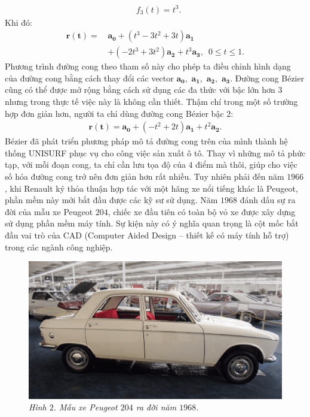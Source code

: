 \begin{multicols}{2}
\begin{align*}
		&f_{3} (t)=t^3.
	\end{align*}
	Khi đó:
	\begin{align*}
		\pmb{r(t)}=\,&\pmb{a_0}+(t^3-3t^2+3t) \pmb{a_1}\\
		&+(-2t^3+3t^2 ) \pmb{a_2}+t^3 \pmb{a_3}, \,\,\,0 \le t \le 1.
	\end{align*}
	Phương trình đường cong theo tham số này cho phép ta điều chỉnh hình dạng của đường cong bằng cách thay đổi các vector $\pmb{a_0},$ $\pmb{a_1},$ $\pmb{a_2},$ $\pmb{a_3}$. Đường cong Bézier cũng có thể được mở rộng bằng cách sử dụng các đa thức với bậc lớn hơn $3$ nhưng trong thực tế việc này là không cần thiết. Thậm chí trong một số trường hợp đơn giản hơn, người ta chỉ dùng đường cong Bézier bậc $2$:
	\begin{align*}
		\pmb{r(t)}=\pmb{a_0}+(-t^2+2t) \pmb{a_1}+t^2 \pmb{a_2}.
	\end{align*}
	Bézier đã phát triển phương pháp mô tả đường cong trên của mình thành hệ thống UNISURF phục vụ cho công việc sản xuất ô tô. Thay vì những mô tả phức tạp, với mỗi đoạn cong, ta chỉ cần lưu tọa độ của $4$ điểm mà thôi, giúp cho việc số hóa đường cong trở nên đơn giản hơn rất nhiều. Tuy nhiên phải đến năm $1966$, khi Renault ký thỏa thuận hợp tác với một hãng xe nổi tiếng khác là Peugeot, phần mềm này mới bắt đầu được các kỹ sư sử dụng. Năm $1968$ đánh dấu sự ra đời của mẫu xe Peugeot $204$, chiếc xe đầu tiên có toàn bộ vỏ xe được xây dựng sử dụng phần mềm máy tính. Sự kiện này có ý nghĩa quan trọng là cột mốc bắt đầu vai trò của CAD (Computer Aided Design -- thiết kế có máy tính hỗ trợ) trong các ngành công nghiệp.
	\begin{figure}[H]
		\vspace*{-5pt}
		\centering
		\captionsetup{labelformat= empty, justification=centering}
		\includegraphics[width= 1\linewidth]{3}
		\caption{\small\textit{\color{toanhocdoisong}Hình $2$. Mẫu xe Peugeot $204$ ra đời năm $1968$.}}

\end{figure}
\end{multicols}
